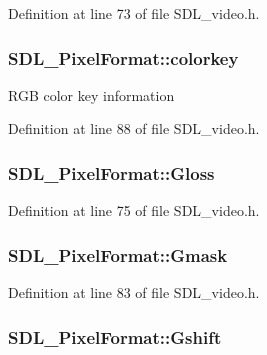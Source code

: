 Definition at line 73 of file S\+D\+L\+\_\+video.\+h.

\hypertarget{struct_s_d_l___pixel_format_a1413d87ed860296a49f8b2d8fd8ad778}{}
\subsubsection[{colorkey}]{ S\+D\+L\+\_\+\+Pixel\+Format\+::colorkey}\label{struct_s_d_l___pixel_format_a1413d87ed860296a49f8b2d8fd8ad778}
R\+G\+B color key information 

Definition at line 88 of file S\+D\+L\+\_\+video.\+h.

\hypertarget{struct_s_d_l___pixel_format_a94469768d8436e631a13d68623ff663f}{}
\subsubsection[{Gloss}]{ S\+D\+L\+\_\+\+Pixel\+Format\+::\+Gloss}\label{struct_s_d_l___pixel_format_a94469768d8436e631a13d68623ff663f}


Definition at line 75 of file S\+D\+L\+\_\+video.\+h.

\hypertarget{struct_s_d_l___pixel_format_a3d07a81b430202c6ea0089d8df8f4e15}{}
\subsubsection[{Gmask}]{ S\+D\+L\+\_\+\+Pixel\+Format\+::\+Gmask}\label{struct_s_d_l___pixel_format_a3d07a81b430202c6ea0089d8df8f4e15}


Definition at line 83 of file S\+D\+L\+\_\+video.\+h.

\hypertarget{struct_s_d_l___pixel_format_a6045012f994c02a86bdc4a91b28d2a3c}{}
\subsubsection[{Gshift}]{ S\+D\+L\+\_\+\+Pixel\+Format\+::\+Gshift}\label{struct_s_d_l___pixel_format_a6045012f994c02a86bdc4a91b28d2a3c}


